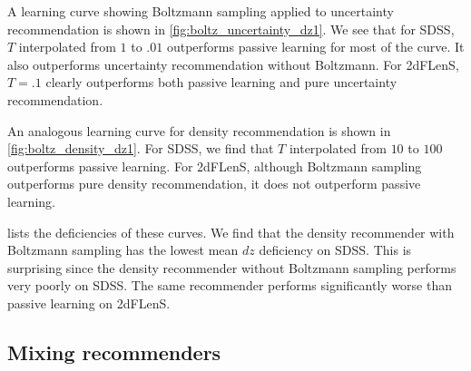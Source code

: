 \documentclass[11pt,twoside,openright]{report}
\begin{document}
A learning curve showing Boltzmann sampling applied to uncertainty recommendation is shown in \cref{fig:boltz_uncertainty_dz1}. We see that for SDSS, $T$ interpolated from $1$ to $.01$ outperforms passive learning for most of the curve. It also outperforms uncertainty recommendation without Boltzmann. For 2dFLenS, $T=.1$ clearly outperforms both passive learning and pure uncertainty recommendation.

An analogous learning curve for density recommendation is shown in \cref{fig:boltz_density_dz1}. For SDSS, we find that $T$ interpolated from $10$ to $100$ outperforms passive learning. For 2dFLenS, although Boltzmann sampling outperforms pure density recommendation, it does not outperform passive learning.

 lists the deficiencies of these curves. We find that the density recommender with Boltzmann sampling has the lowest mean $dz$ deficiency on SDSS. This is surprising since the density recommender without Boltzmann sampling performs very poorly on SDSS. The same recommender performs significantly worse than passive learning on 2dFLenS.

\subsection{Mixing recommenders}
\end{document}
